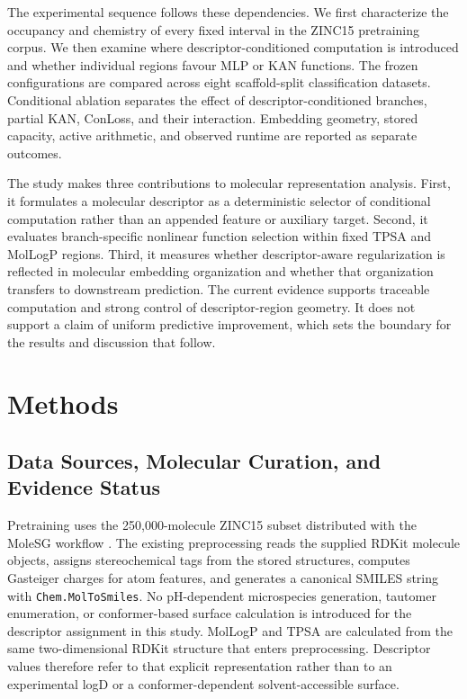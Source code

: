 \documentclass[journal=jcisd8,manuscript=article]{achemso}
\begin{document}
The experimental sequence follows these dependencies. We first characterize
the occupancy and chemistry of every fixed interval in the ZINC15 pretraining
corpus. We then examine where descriptor-conditioned computation is introduced
and whether individual regions favour MLP or KAN functions. The frozen
configurations are compared across eight scaffold-split classification
datasets. Conditional ablation separates the effect of descriptor-conditioned
branches, partial KAN, ConLoss, and their interaction. Embedding geometry,
stored capacity, active arithmetic, and observed runtime are reported as
separate outcomes.

The study makes three contributions to molecular representation analysis.
First, it formulates a molecular descriptor as a deterministic selector of
conditional computation rather than an appended feature or auxiliary target.
Second, it evaluates branch-specific nonlinear function selection within fixed
TPSA and MolLogP regions. Third, it measures whether descriptor-aware
regularization is reflected in molecular embedding organization and whether
that organization transfers to downstream prediction. The current evidence
supports traceable computation and strong control of descriptor-region geometry.
It does not support a claim of uniform predictive improvement, which sets the
boundary for the results and discussion that follow.

\clearpage

\section{Methods}
\label{sec:methods}

\subsection{Data Sources, Molecular Curation, and Evidence Status}

Pretraining uses the 250,000-molecule ZINC15 subset distributed with the
MoleSG workflow \cite{Sterling2015ZINC,Shen2024MoleSG}. The existing
preprocessing reads the supplied RDKit molecule objects, assigns stereochemical
tags from the stored structures, computes Gasteiger charges for atom features,
and generates a canonical SMILES string with \texttt{Chem.MolToSmiles}. No
pH-dependent microspecies generation, tautomer enumeration, or conformer-based
surface calculation is introduced for the descriptor assignment in this study.
MolLogP and TPSA are calculated from the same two-dimensional RDKit structure
that enters preprocessing. Descriptor values therefore refer to that explicit
representation rather than to an experimental logD or a conformer-dependent
solvent-accessible surface.
\end{document}

